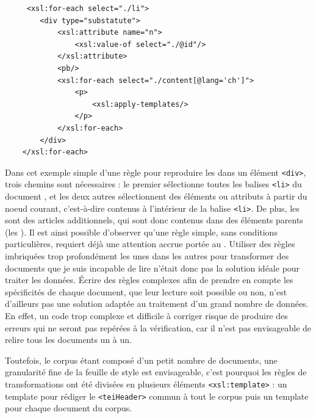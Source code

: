 \begin{verbatim}
     <xsl:for-each select="./li">
        <div type="substatute">
            <xsl:attribute name="n">
                <xsl:value-of select="./@id"/>
            </xsl:attribute>
            <pb/>
            <xsl:for-each select="./content[@lang='ch']">
                <p>
                    <xsl:apply-templates/>
                </p>
            </xsl:for-each>
        </div>
    </xsl:for-each>
\end{verbatim}

Dans cet exemple simple d'une règle pour reproduire les \li dans un élément \texttt{<div>}, trois chemins \xpath sont nécessaires : le premier sélectionne toutes les balises \texttt{<li>} du document \XML, et les deux autres sélectionnent des éléments ou attributs à partir du noeud courant, c'est-à-dire contenus à l'intérieur de la balise \texttt{<li>}. De plus, les \li sont des articles additionnels, qui sont donc contenus dans des éléments parents (les \lu). Il est ainsi possible d'observer qu'une règle simple, sans conditions particulières, requiert déjà une attention accrue portée au \xpath. Utiliser des règles imbriquées trop profondément les unes dans les autres pour transformer des documents que je suis incapable de lire n'était donc pas la solution idéale pour traiter les données. Écrire des règles complexes afin de prendre en compte les spécificités de chaque document, que leur lecture soit possible ou non, n'est d'ailleurs pas une solution adaptée au traitement d'un grand nombre de données. En effet, un code trop complexe et difficile à corriger risque de produire des erreurs qui ne seront pas repérées à la vérification, car il n'est pas envisageable de relire tous les documents un à un. 

Toutefois, le corpus étant composé d'un petit nombre de documents, une granularité fine de la feuille de style est envisageable, c'est pourquoi les règles de transformations ont été divisées en plusieurs éléments \texttt{<xsl:template>} : un template pour rédiger le \texttt{<teiHeader>} commun à tout le corpus puis un template pour chaque document du corpus. 

